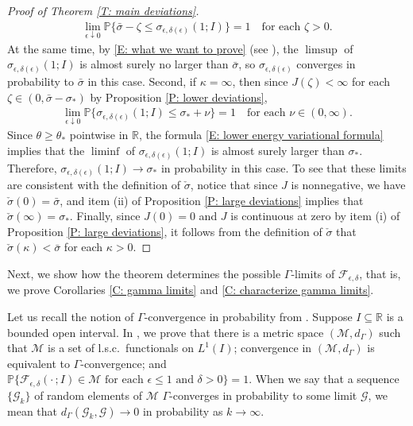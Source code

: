 \documentclass[10pt,a4paper]{amsart}
\begin{document}
\begin{proof}[Proof of Theorem \ref{T: main deviations}]
	\begin{align*}
		\lim_{ \epsilon \downarrow 0 } \mathbb{P} \{  \bar{\sigma} - \zeta \leq \sigma_{\epsilon,\delta(\epsilon)}(1; I ) \} = 1 \quad \text{for each} \, \, \zeta > 0.
	\end{align*}
At the same time, by \eqref{E: what we want to prove} (see \cite[Theorem 2]{part1}), the $\limsup$ of $\sigma_{\epsilon,\delta(\epsilon)}(1;I)$ is almost surely no larger than $\bar{\sigma}$, so $\sigma_{\epsilon,\delta(\epsilon)}$ converges in probability to $\bar{\sigma}$ in this case.
Second, if $\kappa = \infty$, then since $J(\zeta) < \infty$ for each $\zeta \in (0,\bar{\sigma} - \sigma_{*})$ by Proposition \ref{P: lower deviations}, 
	\begin{align*}
		\lim_{ \epsilon \downarrow 0 } \mathbb{P} \{  \sigma_{\epsilon,\delta(\epsilon)}(1; I ) \leq \sigma_{*} + \nu \} = 1 \quad \text{for each} \, \, \nu \in (0,\infty).
	\end{align*}
Since $\theta \geq \theta_{*}$ pointwise in $\mathbb{R}$, the formula \eqref{E: lower energy variational formula} implies that the $\liminf$ of $\sigma_{\epsilon,\delta(\epsilon)}(1;I)$ is almost surely larger than $\sigma_{*}$.  Therefore, $\sigma_{\epsilon,\delta(\epsilon)}(1;I) \to \sigma_{*}$ in probability in this case.  To see that these limits are consistent with the definition of $\check{\sigma}$, notice that since $J$ is nonnegative, we have $\check{\sigma}(0) = \bar{\sigma}$, and item (ii) of Proposition \ref{P: large deviations} implies that $\check{\sigma}(\infty) = \sigma_{*}$. Finally, since $J(0) = 0$ and $J$ is continuous at zero by item (i) of Proposition \ref{P: large deviations}, it follows from the definition of $\check{\sigma}$ that $\check{\sigma}(\kappa) < \bar{\sigma}$ for each $\kappa > 0$.
\end{proof}

Next, we show how the theorem determines the possible $\Gamma$-limits of $\mathscr{F}_{\epsilon,\delta}$, that is, we prove Corollaries \ref{C: gamma limits} and \ref{C: characterize gamma limits}.

Let us recall the notion of $\Gamma$-convergence in probability from \cite{part1}.  Suppose $I \subseteq \mathbb{R}$ is a bounded open interval.  In \cite[Appendix B]{part1}, we prove that there is a metric space $(\mathcal{M},d_{\Gamma})$ such that $\mathcal{M}$ is a set of l.s.c.\ functionals on $L^{1}(I)$;  convergence in $(\mathcal{M},d_{\Gamma})$ is equivalent to $\Gamma$-convergence; and $\mathbb{P} \{ \mathscr{F}_{\epsilon,\delta}(\cdot \, ; I ) \in \mathcal{M} \, \, \text{for each} \, \, \epsilon \leq 1 \, \, \text{and} \, \, \delta > 0 \} = 1$.  When we say that a sequence $\{ \mathscr{G}_{k} \}$ of random elements of $\mathcal{M}$ $\Gamma$-converges in probability to some limit $\mathscr{G}$, we mean that $d_{\Gamma}(\mathscr{G}_{k},\mathscr{G}) \to 0$ in probability as $k \to \infty$. 
\end{document}
